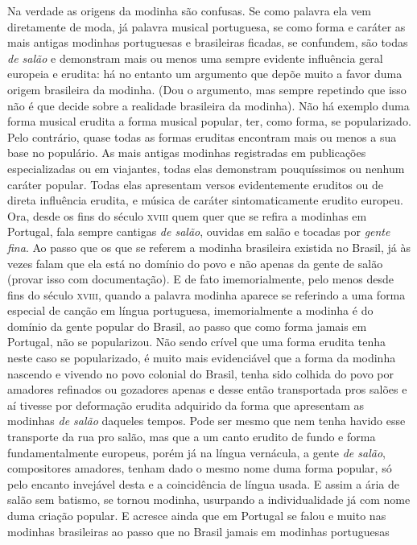 Na verdade as origens da modinha são confusas. Se como palavra ela vem
diretamente de moda, já palavra musical portuguesa, se como forma e
caráter as mais antigas modinhas portuguesas e brasileiras ficadas, se
confundem, são todas \textit{de salão} e demonstram mais ou menos uma sempre
evidente influência geral europeia e erudita: há no entanto um argumento
que depõe muito a favor duma origem brasileira da modinha. (Dou o
argumento, mas sempre repetindo que isso não é que decide sobre a
realidade brasileira da modinha). Não há exemplo duma forma musical
erudita a forma musical popular, ter, como forma, se popularizado. Pelo
contrário, quase todas as formas eruditas encontram mais ou menos a sua
base no populário. As mais antigas modinhas registradas em publicações
especializadas ou em viajantes, todas elas demonstram pouquíssimos ou
nenhum caráter popular. Todas elas apresentam versos evidentemente
eruditos ou de direta influência erudita, e música de caráter
sintomaticamente erudito europeu. Ora, desde os fins do século \textsc{xviii} quem
quer que se refira a modinhas em Portugal, fala sempre cantigas \textit{de
salão}, ouvidas em salão e tocadas por \textit{gente fina}. Ao passo que os que
se referem a modinha brasileira existida no Brasil, já às vezes falam
que ela está no domínio do povo e não apenas da gente de salão (provar
isso com documentação). E de fato imemorialmente, pelo menos desde fins
do século \textsc{xviii}, quando a palavra modinha aparece se referindo a uma forma
especial de canção em língua portuguesa, imemorialmente a modinha é do
domínio da gente popular do Brasil, ao passo que como forma jamais em
Portugal, não se popularizou. Não sendo crível que uma forma erudita
tenha neste caso se popularizado, é muito mais evidenciável que a forma
da modinha nascendo e vivendo no povo colonial do Brasil, tenha sido
colhida do povo por amadores refinados ou gozadores apenas e desse então
transportada pros salões e aí tivesse por deformação erudita adquirido
da forma que apresentam as modinhas \textit{de salão} daqueles tempos. Pode
ser mesmo que nem tenha havido esse transporte da rua pro salão, mas que
a um canto erudito de fundo e forma fundamentalmente europeus, porém já
na língua vernácula, a gente \textit{de salão}, compositores amadores, tenham
dado o mesmo nome duma forma popular, só pelo encanto invejável desta e
a coincidência de língua usada. E assim a ária de salão sem batismo, se
tornou modinha, usurpando a individualidade já com nome duma criação
popular. E acresce ainda que em Portugal se falou e muito nas modinhas
brasileiras ao passo que no Brasil jamais em modinhas portuguesas %

